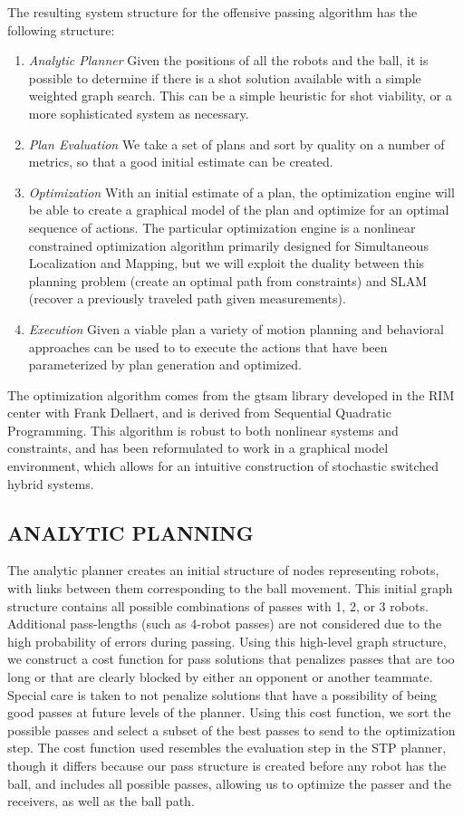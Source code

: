 \documentclass[a4paper, 10pt, conference]{ieeeconf}      %
\begin{document}
The resulting system structure for the offensive passing algorithm has the following structure:
\begin{enumerate}
 \item \textit{Analytic Planner} Given the positions of all the robots and the ball, it is possible to determine if there is a shot solution available with a simple weighted graph search. This can be a simple heuristic for shot viability, or a more sophisticated system as necessary.
 \item \textit{Plan Evaluation} We take a set of plans and sort by quality on a number of metrics, so that a good initial estimate can be created.
 \item \textit{Optimization} With an initial estimate of a plan, the optimization engine will be able to create a graphical model of the plan and optimize for an optimal sequence of actions. The particular optimization engine is a nonlinear constrained optimization algorithm primarily designed for Simultaneous Localization and Mapping, but we will exploit the duality between this planning problem (create an optimal path from constraints) and SLAM (recover a previously traveled path given measurements).
 \item \textit{Execution} Given a viable plan a variety of motion planning and behavioral approaches can be used to to execute the actions that have been parameterized by plan generation and optimized.  
\end{enumerate}

The optimization algorithm comes from the gtsam library\cite{Dellaert05rss} developed in the RIM center with Frank Dellaert, and is derived from Sequential Quadratic Programming. This algorithm is robust to both nonlinear systems and constraints, and has been reformulated to work in a graphical model environment, which allows for an intuitive construction of stochastic switched hybrid systems.

\subsection{ANALYTIC PLANNING}
The analytic planner creates an initial structure of nodes representing robots, with links between them corresponding to the ball movement. This initial graph structure contains all possible combinations of passes with 1, 2, or 3 robots. Additional pass-lengths (such as 4-robot passes) are not considered due to the high probability of errors during passing. Using this high-level graph structure, we construct a cost function for pass solutions that penalizes passes that are too long or that are clearly blocked by either an opponent or another teammate. Special care is taken to not penalize solutions that have a possibility of being good passes at future levels of the planner. Using this cost function, we sort the possible passes and select a subset of the best passes to send to the optimization step.
The cost function used resembles the evaluation step in the STP planner, though it differs because our pass structure is created before any robot has the ball, and includes all possible passes, allowing us to optimize the passer and the receivers, as well as the ball path.
\end{document}
